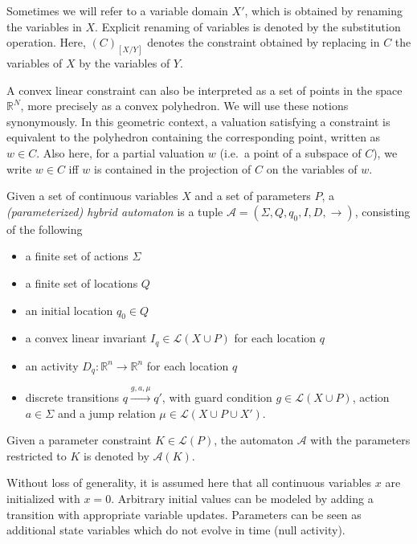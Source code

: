\documentclass{llncs}
\newcommand{\A}{\ensuremath{\mathcal{A}}}
\newcommand{\Reals}{\ensuremath{\mathbb{R}}}
\begin{document}
Sometimes we will refer to a variable domain $X'$, which is obtained
by renaming the variables in $X$. Explicit renaming of variables is
denoted by the substitution operation. Here, $(C)_{[X/Y]}$ denotes the
constraint obtained by replacing in $C$ the variables of $X$ by the variables
of $Y$.

A convex linear constraint can also be interpreted as a set of points
in the space $\Reals^N$, more precisely as a convex polyhedron. We
will use these notions synonymously. In this geometric context, a
valuation satisfying a constraint is equivalent to the polyhedron
containing the corresponding point, written as $w \in C$. Also here,
for a partial valuation $w$ (i.e.~a point of a subspace of $C$), we
write $w \in C$ iff $w$ is contained in the projection of $C$ on the
variables of $w$. 

\begin{definition}\label{def:lha}
  Given a set of continuous variables $X$ and a set of parameters $P$,
  a {\em (parameterized) hybrid automaton} is a tuple $\A = (\Sigma, Q, q_0,
  I, D, \rightarrow)$, consisting of the following
  \begin{itemize}
    \item a finite set of actions $\Sigma$
    \item a finite set of locations $Q$
    \item an initial location $q_0 \in Q$ %
    \item a convex linear invariant $I_q \in \mathcal{L}(X \cup P)$ for each
      location $q$
    \item an activity $D_q : \Reals^n \rightarrow \Reals^n$ for each
      location $q$ 
    \item discrete transitions $q \xrightarrow{g, a, \mu} q'$, with
      guard condition $g \in \mathcal{L}(X \cup P)$, action $a \in \Sigma$
      and a jump relation $\mu \in \mathcal{L}(X \cup P \cup X')$.
  \end{itemize}
  Given a parameter constraint $K \in \mathcal{L}(P)$, the automaton
  $\A$ with the parameters restricted to $K$ is denoted by $\A(K)$.
\end{definition}

Without loss of generality,
it is assumed here that all continuous variables $x$ are initialized
with $x=0$. Arbitrary initial values can be modeled by adding a
transition with appropriate variable updates.
Parameters can be seen as additional state variables which do
not evolve in time (null activity).
\end{document}
